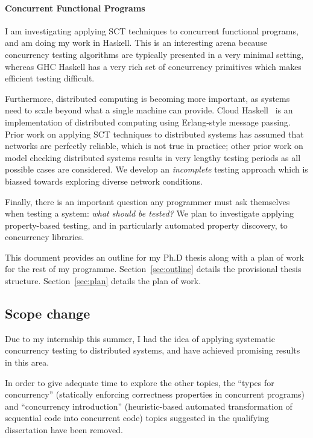 \documentclass{article}
\begin{document}
\paragraph{Concurrent Functional Programs}
I am investigating applying SCT techniques to concurrent functional
programs, and am doing my work in Haskell. This is an interesting
arena because concurrency testing algorithms are typically presented
in a very minimal setting, whereas GHC Haskell has a very rich set of
concurrency primitives which makes efficient testing difficult.

Furthermore, distributed computing is becoming more important, as
systems need to scale beyond what a single machine can provide. Cloud
Haskell~\cite{epstein2011} is an implementation of distributed
computing using Erlang-style message passing. Prior work on applying
SCT techniques to distributed systems has assumed that networks are
perfectly reliable, which is not true in practice; other prior work on
model checking distributed systems results in very lengthy testing
periods as all possible cases are considered. We develop an
\emph{incomplete} testing approach which is biassed towards exploring
diverse network conditions.

Finally, there is an important question any programmer must ask
themselves when testing a system: \emph{what should be tested?} We
plan to investigate applying property-based testing, and in
particularly automated property discovery, to concurrency libraries.

This document provides an outline for my Ph.D thesis along with a plan
of work for the rest of my programme. Section~\ref{sec:outline}
details the provisional thesis structure. Section~\ref{sec:plan}
details the plan of work.

\subsection{Scope change}

Due to my internship this summer, I had the idea of applying
systematic concurrency testing to distributed systems, and have
achieved promising results in this area.

In order to give adequate time to explore the other topics, the
``types for concurrency'' (statically enforcing correctness properties
in concurrent programs) and ``concurrency introduction''
(heuristic-based automated transformation of sequential code into
concurrent code) topics suggested in the qualifying dissertation have
been removed.
\end{document}
